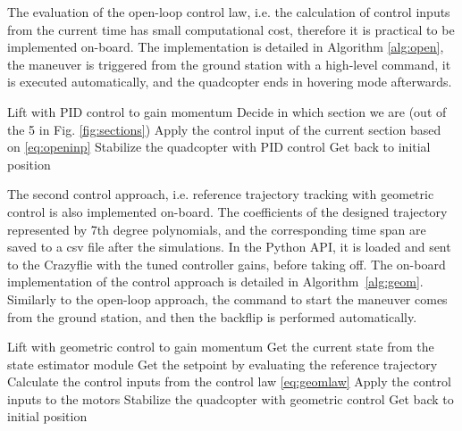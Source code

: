 The evaluation of the open-loop control law, i.e. the calculation of control inputs from the current time has small computational cost, therefore it is practical to be implemented on-board. The implementation is detailed in Algorithm \ref{alg:open}, the maneuver is triggered from the ground station with a high-level command, it is executed automatically, and the quadcopter ends in hovering mode afterwards.
\begin{algorithm}
  \cprotect\caption{\verb+performOpenLoopFlip+ on-board implementation}
  \label{alg:open}
  \begin{algorithmic}[1]
    \State Lift with PID control to gain momentum
      \State Decide in which section we are (out of the 5 in Fig. \ref{fig:sections})
      \State Apply the control input of the current section based on \eqref{eq:openinp}
    \EndWhile
    \State Stabilize the quadcopter with PID control
    \State Get back to initial position
  \end{algorithmic}
  \end{algorithm}
The second control approach, i.e. reference trajectory tracking with geometric control is also implemented on-board. The coefficients of the designed trajectory represented by 7th degree polynomials, and the corresponding time span are saved to a csv file after the simulations. In the Python API, it is loaded and sent to the Crazyflie with the tuned controller gains, before taking off. The on-board implementation of the control approach is detailed in Algorithm~\ref{alg:geom}. Similarly to the open-loop approach, the command to start the maneuver comes from the ground station, and then the backflip is performed automatically.
\begin{algorithm}
  \cprotect\caption{\verb+performGeomFlip+ on-board implementation}
  \label{alg:geom}
  \begin{algorithmic}[1]
    \State Lift with geometric control to gain momentum
      \State Get the current state from the state estimator module
      \State Get the setpoint by evaluating the reference trajectory
      \State Calculate the control inputs from the control law \eqref{eq:geomlaw}
      \State Apply the control inputs to the motors
    \EndWhile
    \State Stabilize the quadcopter with geometric control
    \State Get back to initial position
  \end{algorithmic}
  \end{algorithm}

